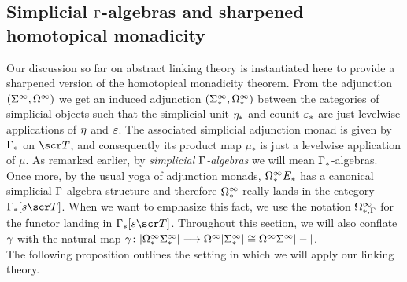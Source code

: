 \documentclass{amsart}
\theoremstyle{definition}
\begin{document}
\subsection{Simplicial $\Gamma$-algebras and sharpened homotopical monadicity}\label{subsec:sharpen}
Our discussion so far on abstract linking theory is instantiated here to provide a sharpened version of the homotopical monadicity theorem.
From the adjunction $(\Sigma^{\infty},\Omega^{\infty})$ we get an induced adjunction $(\Sigma^{\infty}_*,\Omega^{\infty}_{*})$ between the categories of simplicial objects such that the simplicial unit $\eta_*$ and counit $\varepsilon_*$ are just levelwise applications of $\eta$ and $\varepsilon$.
The associated simplicial adjunction monad is given by $\Gamma_*$ on $\sT$, and consequently its product map $\mu_*$ is just a levelwise application of $\mu$. As remarked earlier, by \emph{simplicial} $\Gamma$\emph{-algebras} we will mean $\Gamma_*$-algebras. Once more, by the usual yoga of adjunction monads, 
$\Omega^{\infty}_* E_*$ has a canonical simplicial $\Gamma$-algebra structure and therefore $\Omega^{\infty}_*$ really lands in the category $\GA_*[s\sT]$. When we want to emphasize this fact, we use the notation $\Omega^{\infty}_{*,\Gamma}$ for the functor landing in $\GA_*[s\sT]$. Throughout this section, we will also conflate $\gamma$ with the natural map $\gamma \colon |\Omega^{\infty}_* \Sigma^{\infty}_*| \longrightarrow \Omega^{\infty} |\Sigma^{\infty}_*| \cong \Omega^{\infty} \Sigma^{\infty} |-|$.\\

The following proposition outlines the setting in which we will apply our linking theory.

\end{document}

